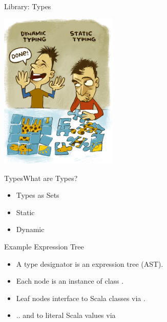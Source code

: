 {  
\begin{frame}{Library: }{Types}
  \centering
  
    \includegraphics[height=7.5cm]{typing.png}
\end{frame}
}

\begin{frame}{Types}{What are Types?}
  \begin{itemize}
  \item Types as Sets
  \item Static
  \item Dynamic
  \end{itemize}
\end{frame}



\newsavebox\tdast
\begin{lrbox}{\tdast}
  \begin{minipage}{11cm}
    
  \end{minipage}
\end{lrbox}


\begin{frame}{Example  Expression Tree}
  \usebox\tdast

  \medskip

  \centering

  \scalebox{0.7}{}
  \begin{itemize}
  \item A type designator is an expression tree (AST).
  \item Each node is an instance of class .
  \item Leaf nodes interface to Scala classes via .
  \item .. and to literal Scala values via 
  \end{itemize}
\end{frame}


